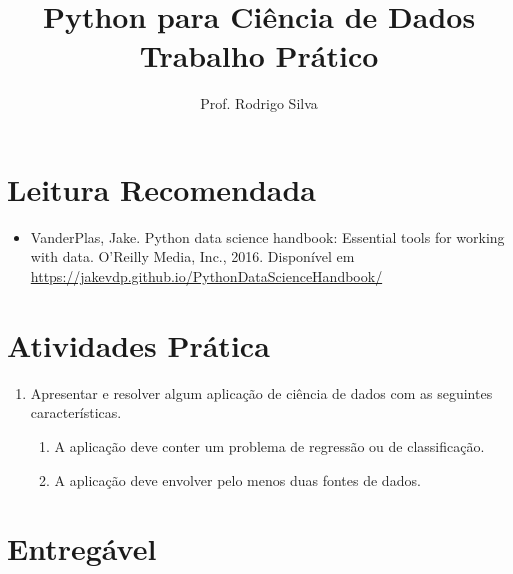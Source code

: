 \documentclass{article}
\title{\vspace{-2 cm}Python para Ciência de Dados \\ Trabalho Prático}
\author{Prof. Rodrigo Silva}
\date{}
\begin{document}
\maketitle



\section{Leitura Recomendada }

\begin{itemize}
    \item VanderPlas, Jake. Python data science handbook: Essential tools for working with data. O'Reilly Media, Inc., 2016. Disponível em \url{https://jakevdp.github.io/PythonDataScienceHandbook/}
\end{itemize}


\section{Atividades Prática}

\begin{enumerate}
    \item  Apresentar e resolver algum aplicação de ciência de dados com as seguintes características.
    \begin{enumerate}
        \item A aplicação deve conter um problema de regressão ou de classificação.
        \item A aplicação deve envolver pelo menos duas fontes de dados.
    \end{enumerate}
\end{enumerate}

\section{Entregável}
\end{document}
